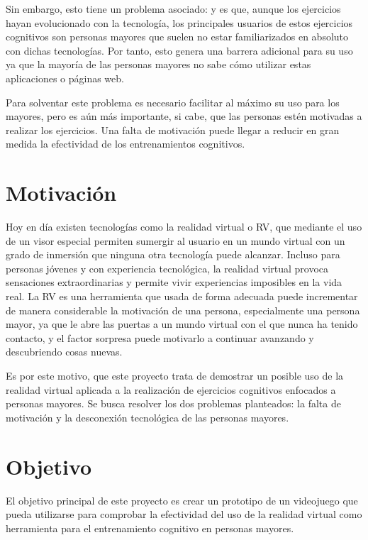 Sin embargo, esto tiene un problema asociado: y es que, aunque los ejercicios hayan evolucionado con la tecnología, los principales usuarios de estos ejercicios cognitivos son personas mayores que suelen no estar familiarizados en absoluto con dichas tecnologías. Por tanto, esto genera una barrera adicional para su uso ya que la mayoría de las personas mayores no sabe cómo utilizar estas aplicaciones o páginas web.

Para solventar este problema es necesario facilitar al máximo su uso para los mayores, pero es aún más importante, si cabe, que las personas estén motivadas a realizar los ejercicios. Una falta de motivación puede llegar a reducir en gran medida la efectividad de los entrenamientos cognitivos. 



\section{Motivación}

Hoy en día existen tecnologías como la realidad virtual o RV, que mediante el uso de un visor especial permiten sumergir al usuario en un mundo virtual con un grado de inmersión que ninguna otra tecnología puede alcanzar. Incluso para personas jóvenes y con experiencia tecnológica, la realidad virtual provoca sensaciones extraordinarias y permite vivir experiencias imposibles en la vida real. La RV es una herramienta que usada de forma adecuada puede incrementar de manera considerable la motivación de una persona, especialmente una persona mayor, ya que le abre las puertas a un mundo virtual con el que nunca ha tenido contacto, y el factor sorpresa puede motivarlo a continuar avanzando y descubriendo cosas nuevas.

Es por este motivo, que este proyecto trata de demostrar un posible uso de la realidad virtual aplicada a la realización de ejercicios cognitivos enfocados a personas mayores. Se busca resolver los dos problemas planteados: la falta de motivación y la desconexión tecnológica de las personas mayores.


\section{Objetivo}

El objetivo principal de este proyecto es crear un prototipo de un videojuego que pueda utilizarse para comprobar la efectividad del uso de la realidad virtual como herramienta para el entrenamiento cognitivo en personas mayores.


